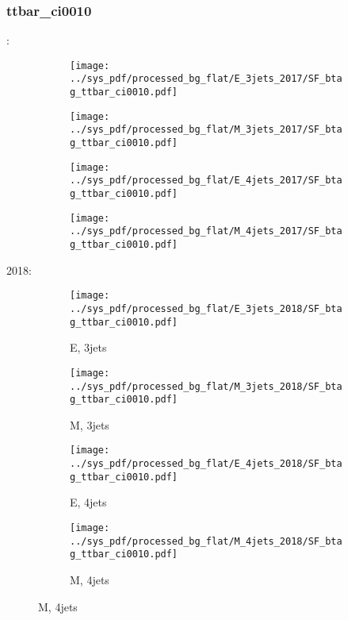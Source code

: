 \documentclass{beamer}
\begin{document}
\begin{frame}
\frametitle{ttbar_ci0010}
\fontsize{5}{1}:
\begin{figure}
\centering
\begin{subfigure}[b]{0.24\textwidth}
\texttt{[image: ../sys\_pdf/processed\_bg\_flat/E\_3jets\_2017/SF\_btag\_ttbar\_ci0010.pdf]}
\end{subfigure}
\begin{subfigure}[b]{0.24\textwidth}
\texttt{[image: ../sys\_pdf/processed\_bg\_flat/M\_3jets\_2017/SF\_btag\_ttbar\_ci0010.pdf]}
\end{subfigure}
\begin{subfigure}[b]{0.24\textwidth}
\texttt{[image: ../sys\_pdf/processed\_bg\_flat/E\_4jets\_2017/SF\_btag\_ttbar\_ci0010.pdf]}
\end{subfigure}
\begin{subfigure}[b]{0.24\textwidth}
\texttt{[image: ../sys\_pdf/processed\_bg\_flat/M\_4jets\_2017/SF\_btag\_ttbar\_ci0010.pdf]}
\end{subfigure}
\end{figure}
2018:
\begin{figure}
\centering
\begin{subfigure}[b]{0.24\textwidth}
\texttt{[image: ../sys\_pdf/processed\_bg\_flat/E\_3jets\_2018/SF\_btag\_ttbar\_ci0010.pdf]}
\captionsetup{font=tiny}
\caption{E, 3jets}
\end{subfigure}
\begin{subfigure}[b]{0.24\textwidth}
\texttt{[image: ../sys\_pdf/processed\_bg\_flat/M\_3jets\_2018/SF\_btag\_ttbar\_ci0010.pdf]}
\captionsetup{font=tiny}
\caption{M, 3jets}
\end{subfigure}
\begin{subfigure}[b]{0.24\textwidth}
\texttt{[image: ../sys\_pdf/processed\_bg\_flat/E\_4jets\_2018/SF\_btag\_ttbar\_ci0010.pdf]}
\captionsetup{font=tiny}
\caption{E, 4jets}
\end{subfigure}
\begin{subfigure}[b]{0.24\textwidth}
\texttt{[image: ../sys\_pdf/processed\_bg\_flat/M\_4jets\_2018/SF\_btag\_ttbar\_ci0010.pdf]}
\captionsetup{font=tiny}
\caption{M, 4jets}
\end{subfigure}
\end{figure}
\end{frame}
\end{document}
